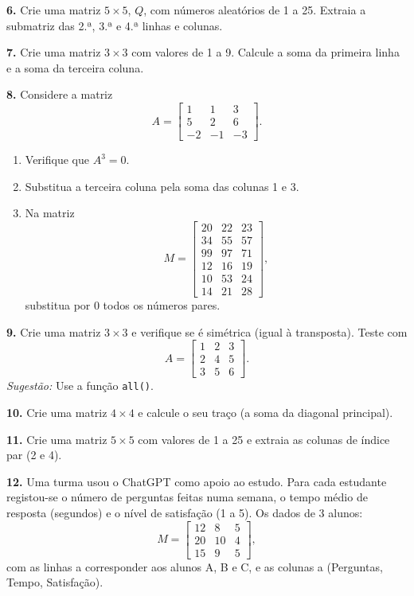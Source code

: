 \documentclass[
  portuguese,
  11pt,
  openany]{book}
\providecommand{\tightlist}{%
  \setlength{\itemsep}{0pt}\setlength{\parskip}{0pt}}
\begin{document}
\textbf{6.} Crie uma matriz \(5 \times 5\), \(Q\), com números aleatórios de 1 a 25.
Extraia a submatriz das 2.ª, 3.ª e 4.ª linhas e colunas.

\textbf{7.} Crie uma matriz \(3 \times 3\) com valores de 1 a 9. Calcule a soma da
primeira linha e a soma da terceira coluna.

\textbf{8.} Considere a matriz
\[A = \begin{bmatrix} 1 & 1 & 3 \\ 5 & 2 & 6 \\ -2 & -1 & -3 \end{bmatrix}.\]

\begin{enumerate}
\def\labelenumi{(\alph{enumi})}
\tightlist
\item
  Verifique que \(A^3 = 0\).
\item
  Substitua a terceira coluna pela soma das colunas 1 e 3.
\item
  Na matriz
  \[M = \begin{bmatrix} 20 & 22 & 23 \\ 34 & 55 & 57 \\ 99 & 97 & 71 \\
  12 & 16 & 19 \\ 10 & 53 & 24 \\ 14 & 21 & 28 \end{bmatrix},\]
  substitua por 0 todos os números pares.
\end{enumerate}

\textbf{9.} Crie uma matriz \(3 \times 3\) e verifique se é simétrica (igual à
transposta). Teste com
\[A = \begin{bmatrix} 1 & 2 & 3 \\ 2 & 4 & 5 \\ 3 & 5 & 6 \end{bmatrix}.\]
\emph{Sugestão:} Use a função \texttt{all()}.

\textbf{10.} Crie uma matriz \(4 \times 4\) e calcule o seu traço (a soma da diagonal
principal).

\textbf{11.} Crie uma matriz \(5 \times 5\) com valores de 1 a 25 e extraia as colunas de
índice par (2 e 4).

\textbf{12.} Uma turma usou o ChatGPT como apoio ao estudo. Para cada estudante
registou-se o número de perguntas feitas numa semana, o tempo médio de resposta
(segundos) e o nível de satisfação (1 a 5). Os dados de 3 alunos:
\[M = \begin{bmatrix} 12 & 8 & 5 \\ 20 & 10 & 4 \\ 15 & 9 & 5 \end{bmatrix},\]
com as linhas a corresponder aos alunos A, B e C, e as colunas a (Perguntas,
Tempo, Satisfação).
\end{document}
